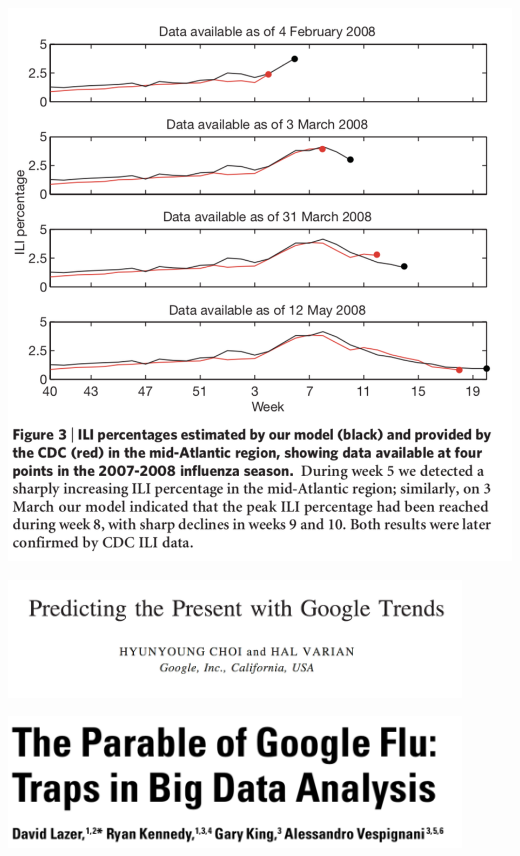 \documentclass[aspectratio=169]{beamer}
\begin{document}
\begin{frame}

\begin{center}
  \includegraphics[height = 0.9\textheight]{figures/ginsburg_detecting_2008_fig3}
\end{center}

\end{frame}
\begin{frame}

\begin{center}
  \includegraphics[width = 0.9\textwidth]{figures/choi_predicting_2012_title}
\end{center}

\end{frame}
\begin{frame}

\begin{center}
  \includegraphics[width = 0.9\textwidth]{figures/lazer_parable_2014_title}
\end{center}

\end{frame}
\end{document}
